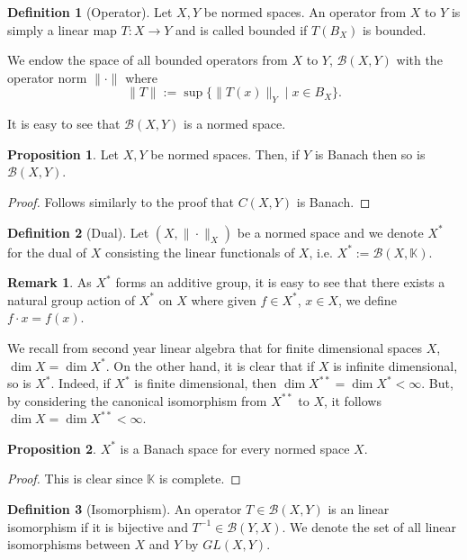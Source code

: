 \documentclass[
]{article}
\theoremstyle{definition}
\newtheorem*{remark}{Remark}
\theoremstyle{definition}
\newtheorem{definition}{Definition}[section]
\newtheorem{proposition}{Proposition}[section]
\begin{document}
\begin{definition}[Operator]
  Let \(X, Y\) be normed spaces. An operator from \(X\) to \(Y\) is simply a 
  linear map \(T : X \to Y\) and is called bounded if \(T(B_X)\) is bounded. 

  We endow the space of all bounded operators from \(X\) to \(Y\), 
  \(\mathcal{B}(X, Y)\) with the operator norm \(\|\cdot\|\) where 
  \[\|T\| := \sup \{\|T(x)\|_Y \mid x \in B_X\}.\]
\end{definition}

It is easy to see that \(\mathcal{B}(X, Y)\) is a normed space. 

\begin{proposition}
  Let \(X, Y\) be normed spaces. Then, if \(Y\) is Banach then so is 
  \(\mathcal{B}(X, Y)\).
\end{proposition}
\begin{proof}
  Follows similarly to the proof that \(C(X, Y)\) is Banach.
\end{proof}

\begin{definition}[Dual]
  Let \((X, \|\cdot\|_X)\) be a normed space and we denote \(X^*\) for the 
  dual of \(X\) consisting the linear functionals of \(X\), i.e. 
  \(X^* := \mathcal{B}(X, \mathbb{K})\).
\end{definition}

\begin{remark}
  As \(X^*\) forms an additive group, it is easy to see that there exists a 
  natural group action of \(X^*\) on \(X\) where given \(f \in X^*\), 
  \(x \in X\), we define \(f \cdot x = f(x)\).
\end{remark}

We recall from second year linear algebra that for finite dimensional spaces 
\(X\), \(\dim X = \dim X^*\). On the other hand, it is clear that if \(X\) is 
infinite dimensional, so is \(X^*\). Indeed, if \(X^*\) is finite dimensional, 
then \(\dim X^{**} = \dim X^* < \infty\). But, by considering the canonical 
isomorphism from \(X^{**}\) to \(X\), it follows \(\dim X = \dim X^{**} < \infty\).

\begin{proposition}
  \(X^*\) is a Banach space for every normed space \(X\).
\end{proposition}
\begin{proof}
  This is clear since \(\mathbb{K}\) is complete.
\end{proof}

\begin{definition}[Isomorphism]
  An operator \(T \in \mathcal{B}(X, Y)\) is an linear isomorphism if it is 
  bijective and \(T^{-1} \in \mathcal{B}(Y, X)\). We denote the set of all 
  linear isomorphisms between \(X\) and \(Y\) by \(GL(X, Y)\).
\end{definition}
\end{document}
